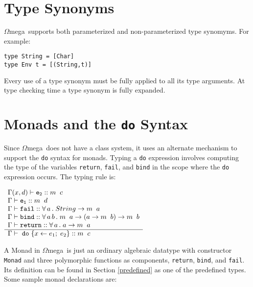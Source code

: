 \documentclass[11pt,twoside]{article}
\newcommand{\om}{$\Omega$mega}
\begin{document}
\section{Type Synonyms} \label{syn}
\om\ supports both parameterized  and non-parameterized type synomyms.
For example:
\begin{verbatim}
type String = [Char]
type Env t = [(String,t)]
\end{verbatim}
Every use of a type synonym must be fully applied to all
its type arguments. At type checking time a type synonym
is fully expanded.

\section{Monads and the {\tt do} Syntax} \label{monads}
Since \om\ does not have a class system, it uses an alternate mechanism
to support the {\tt do} syntax for monads. Typing a {\tt do} expression
involves computing the type of the variables {\tt return}, {\tt fail},
and {\tt bind} in the scope where the {\tt do} expression occurs.
The typing rule is:
\vspace*{.1in}

$
\begin{array}{l}
 \Gamma(x,d) \vdash {\tt e_2} :: m\;\; c \\
 \Gamma \vdash {\tt e_1} :: m\;\; d \\
 \Gamma \vdash {\tt fail} ::  \forall\, a\, .\;String \rightarrow m\;\; a\\
 \Gamma \vdash {\tt bind} :: \forall\, a\, b\, .\; m\;\;a \rightarrow (a \rightarrow m\;\; b) \rightarrow m\;\; b\\
 \Gamma \vdash {\tt return} :: \forall\, a\, .\; a \rightarrow m\;\; a \\ \hline
 \Gamma \vdash \;{\tt do}\; \{ x  \leftarrow e_1; \; e_2 \} :: m\;\;c \
 \end{array}
$

\vspace*{.2in}
A Monad in \om\ is just an ordinary algebraic datatype with constructor {\tt
Monad} and three polymorphic functions as components, {\tt return}, {\tt bind},
and {\tt fail}. Its definition can be found in Section \ref{predefined} as one
of the predefined types. Some sample monad declarations are:
\end{document}

